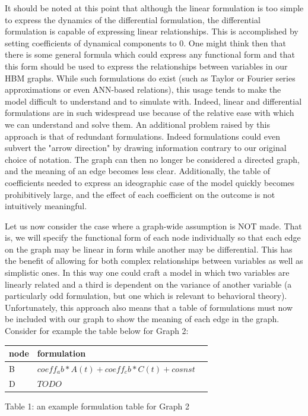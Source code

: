 \documentclass[conference]{IEEEtran}
\begin{document}
It should be noted at this point that although the linear formulation is too simple to express the dynamics of the differential formulation, the differential formulation is capable of expressing linear relationships.
This is accomplished by setting coefficients of dynamical components to 0.
One might think then that there is some general formula which could express any functional form and that this form should be used to express the relationships between variables in our HBM graphs.
While such formulations do exist (such as Taylor or Fourier series approximations or even ANN-based relations), this usage tends to make the model difficult to understand and to simulate with.
Indeed, linear and differential formulations are in such widespread use because of the relative ease with which we can understand and solve them. An additional problem raised by this approach is that of redundant formulations.
Indeed formulations could even subvert the "arrow direction" by drawing information contrary to our original choice of notation.
The graph can then no longer be considered a directed graph, and the meaning of an edge becomes less clear.
Additionally, the table of coefficients needed to express an ideographic case of the model quickly becomes prohibitively large, and the effect of each coefficient on the outcome is not intuitively meaningful.

Let us now consider the case where a graph-wide assumption is NOT made.
That is, we will specify the functional form of each node individually so that each edge on the graph may be linear in form while another may be differential.
This has the benefit of allowing for both complex relationships between variables as well as simplistic ones.
In this way one could craft a model in which two variables are linearly related and a third is dependent on the variance of another variable (a particularly odd formulation, but one which is relevant to behavioral theory).
Unfortunately, this approach also means that a table of formulations must now be included with our graph to show the meaning of each edge in the graph.
Consider for example the table below for Graph 2:

\begin{centering}
\begin{tabular}{ | l | l | l |}
    \hline
    node & formulation \\ \hline
    B & $coeff_ab*A(t) + coeff_cb*C(t) + cosnst$  \\ \hline
    D & $ TODO $ \\ \hline
\end{tabular}
Table 1: an example formulation table for Graph 2 
\end{centering}
\end{document}
